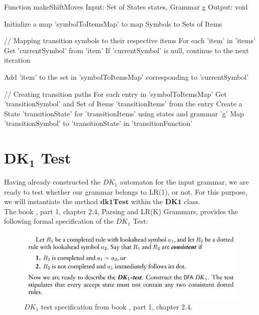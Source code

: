 \begin{codeblock}
    Function makeShiftMoves
    Input: Set of States states, Grammar g
    Output: void

    Initialize a map 'symbolToItemsMap' to map Symbols to Sets of Items

    // Mapping transition symbols to their respective items
    For each 'item' in 'items'
    Get 'currentSymbol' from 'item'
    If 'currentSymbol' is null, continue to the next iteration

    Add 'item' to the set in 'symbolToItemsMap' corresponding to 'currentSymbol'

    // Creating transition paths
    For each entry in 'symbolToItemsMap'
    Get 'transitionSymbol' and Set of Items 'transitionItems' from the entry
    Create a State 'transitionState' for 'transitionItems' using states and grammar 'g'
    Map 'transitionSymbol' to 'transitionState' in 'transitionFunction'
\end{codeblock}

\newpage


\section{\(\boldsymbol{DK_{1}}\) Test}\label{sec:DK1 Test}

Having already constructed the \(DK_{1}\) automaton for the input grammar, we are ready to test whether our grammar belongs to LR(1), or not. For this purpose, we will instantiate the method \(\boldsymbol{dk1Test}\) within the \(\boldsymbol{DK1}\) class.\\

The book \cite{sipser}, part 1, chapter 2.4, Parsing and LR(K) Grammars, provides the following formal specification of the \(DK_{1}\) Test:


\begin{figure}[h!]
    \includegraphics[width=\linewidth]{DK1 test conditions.png}
    \caption{\(DK_{1}\) test specification from book \cite{sipser}, part 1, chapter 2.4.}
    \label{4}
\end{figure}


